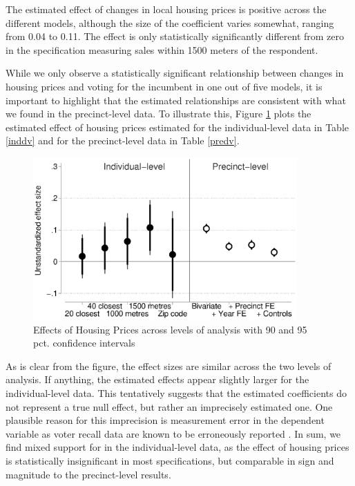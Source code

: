 \documentclass[12pt,a4paper]{article}
\begin{document}
	
	
	The estimated effect of changes in local housing prices is positive across the different models, although the size of the coefficient varies somewhat, ranging from 0.04 to 0.11. The effect is only statistically significantly different from zero in the specification measuring sales within 1500 meters of the respondent.
	
	While we only observe a statistically significant relationship between changes in housing prices and voting for the incumbent in one out of five models, it is important to highlight that the estimated relationships are consistent with what we found in the precinct-level data. To illustrate this, Figure \ref{comparison} plots the estimated effect of housing prices estimated for the individual-level data in Table \ref{inddv} and for the precinct-level data in Table \ref{predv}.
	
	\begin{figure}[htbp!]
		\includegraphics[width=0.9\textwidth]{../figures/comparison.eps}
		\centering
		\caption{Effects of Housing Prices across levels of analysis with 90 and 95 pct. confidence intervals}\label{comparison}
	\end{figure}
	
	
	As is clear from the figure, the effect sizes are similar across the two levels of analysis. If anything, the estimated effects appear slightly larger for the individual-level data. This tentatively suggests that the estimated coefficients do not represent a true null effect, but rather an imprecisely estimated one. One plausible reason for this imprecision is measurement error in the dependent variable as voter recall data are known to be erroneously reported \citep[e.g.,][]{bernstein2001overreporting}. In sum, we find mixed support for \hone in the individual-level data, as the effect of housing prices is statistically insignificant in most specifications, but comparable in sign and magnitude to the precinct-level results.
	
\end{document}

